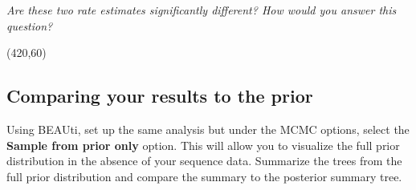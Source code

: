 \documentclass[12pt]{article}
\begin{document}
\textit{Are these two rate estimates significantly different? How would you answer this question?}
 
 \vspace{5 mm}
 \framebox(420,60){}
   \vspace{5 mm}


\subsection*{Comparing your results to the prior}

Using BEAUti, set up the same analysis but under the MCMC options, select the {\bf Sample from prior only} option. This will allow you to visualize the full prior distribution in the absence of your sequence data. Summarize the trees from the full prior
distribution and compare the summary to the posterior summary tree.
\end{document}
